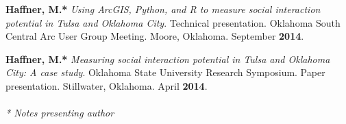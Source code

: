 \begin{cventries}
{\begin{cvitems}
            \item {\textbf{Haffner, M.*} \textit{Using ArcGIS, Python, and R to measure social interaction potential in Tulsa and Oklahoma City}. Technical presentation. Oklahoma South Central Arc User Group Meeting. Moore, Oklahoma. September \textbf{2014}.} \\
            \item {\textbf{Haffner, M.*} \textit{Measuring social interaction potential in Tulsa and Oklahoma City: A case study}. Oklahoma State University Research Symposium. Paper presentation. Stillwater, Oklahoma. April \textbf{2014}.} \\\\
            \textit{* Notes presenting author}
        \end{cvitems}
    }
\end{cventries}